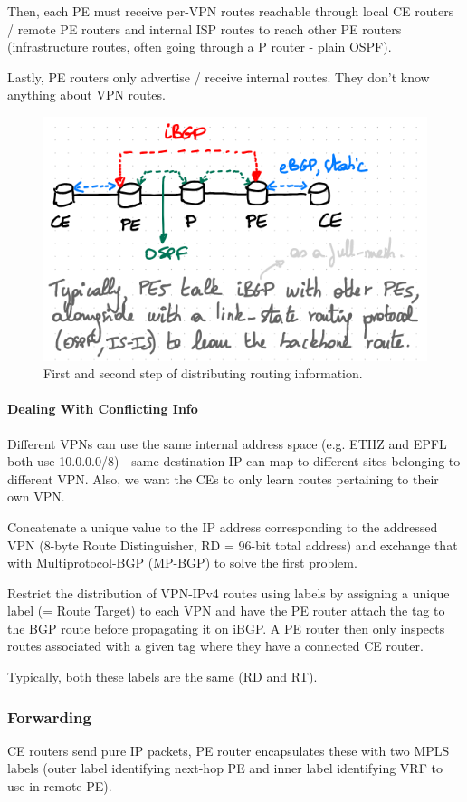 Then, each PE must receive per-VPN routes reachable through local CE routers / remote PE routers and internal ISP routes to reach other PE routers (infrastructure routes, often going through a P router - plain OSPF).

Lastly, PE routers only advertise / receive internal routes. They don't know anything about VPN routes.

\begin{figure}[h]
	\centering
	\includegraphics[scale=0.6]{images/3-routing.PNG}
	\caption{First and second step of distributing routing information.}
	\label{fig:routing}
\end{figure}

\paragraph{Dealing With Conflicting Info}
Different VPNs can use the same internal address space (e.g. ETHZ and EPFL both use 10.0.0.0/8) - same destination IP can map to different sites belonging to different VPN. Also, we want the CEs to only learn routes pertaining to their own VPN.

Concatenate a unique value to the IP address corresponding to the addressed VPN (8-byte Route Distinguisher, RD = 96-bit total address) and exchange that with Multiprotocol-BGP (MP-BGP) to solve the first problem.

Restrict the distribution of VPN-IPv4 routes using labels by assigning a unique label (= Route Target) to each VPN and have the PE router attach the tag to the BGP route before propagating it on iBGP. A PE router then only inspects routes associated with a given tag where they have a connected CE router.

Typically, both these labels are the same (RD and RT).


\subsubsection{Forwarding}

CE routers send pure IP packets, PE router encapsulates these with two MPLS labels (outer label identifying next-hop PE and inner label identifying VRF to use in remote PE).